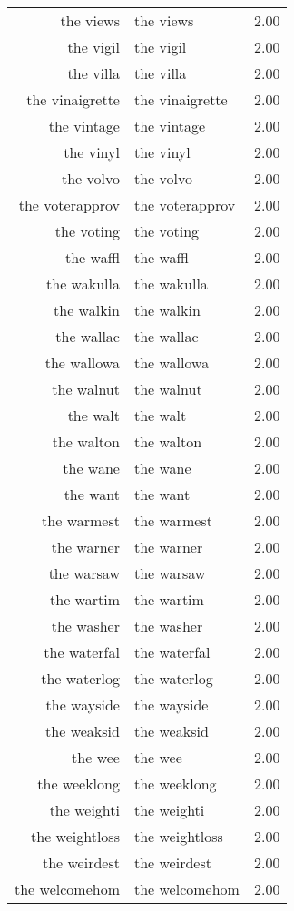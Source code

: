 \begin{table}[ht]
\begin{tabular}{rlr}
  the views & the views & 2.00 \\ 
  the vigil & the vigil & 2.00 \\ 
  the villa & the villa & 2.00 \\ 
  the vinaigrette & the vinaigrette & 2.00 \\ 
  the vintage & the vintage & 2.00 \\ 
  the vinyl & the vinyl & 2.00 \\ 
  the volvo & the volvo & 2.00 \\ 
  the voterapprov & the voterapprov & 2.00 \\ 
  the voting & the voting & 2.00 \\ 
  the waffl & the waffl & 2.00 \\ 
  the wakulla & the wakulla & 2.00 \\ 
  the walkin & the walkin & 2.00 \\ 
  the wallac & the wallac & 2.00 \\ 
  the wallowa & the wallowa & 2.00 \\ 
  the walnut & the walnut & 2.00 \\ 
  the walt & the walt & 2.00 \\ 
  the walton & the walton & 2.00 \\ 
  the wane & the wane & 2.00 \\ 
  the want & the want & 2.00 \\ 
  the warmest & the warmest & 2.00 \\ 
  the warner & the warner & 2.00 \\ 
  the warsaw & the warsaw & 2.00 \\ 
  the wartim & the wartim & 2.00 \\ 
  the washer & the washer & 2.00 \\ 
  the waterfal & the waterfal & 2.00 \\ 
  the waterlog & the waterlog & 2.00 \\ 
  the wayside & the wayside & 2.00 \\ 
  the weaksid & the weaksid & 2.00 \\ 
  the wee & the wee & 2.00 \\ 
  the weeklong & the weeklong & 2.00 \\ 
  the weighti & the weighti & 2.00 \\ 
  the weightloss & the weightloss & 2.00 \\ 
  the weirdest & the weirdest & 2.00 \\ 
  the welcomehom & the welcomehom & 2.00 \\ 

\end{tabular}
\end{table}
